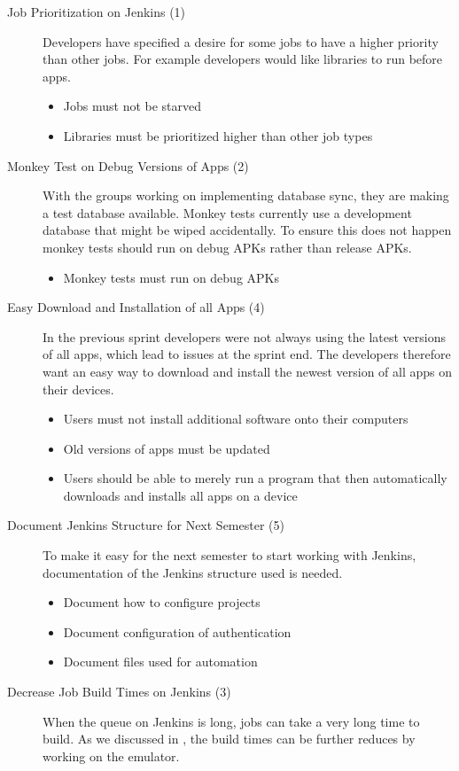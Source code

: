 \begin{description}
  \item[Job Prioritization on Jenkins (1)] Developers have specified a desire for some jobs to have a higher priority than other jobs. For example developers would like libraries to run before apps.
  \begin{itemize}
    \item Jobs must not be starved
    \item Libraries must be prioritized higher than other job types
  \end{itemize}
  \item[Monkey Test on Debug Versions of Apps (2)] With the \db groups working on implementing database sync, they are making a test database available. Monkey tests currently use a development database that might be wiped accidentally. To ensure this does not happen monkey tests should run on debug APKs rather than release APKs.
  \begin{itemize}
    \item Monkey tests must run on debug APKs
  \end{itemize}
  \item[Easy Download and Installation of all Apps (4)] In the previous sprint developers were not always using the latest versions of all apps, which lead to issues at the sprint end. The developers therefore want an easy way to download and install the newest version of all apps on their devices.
  \begin{itemize}
    \item Users must not install additional software onto their computers
    \item Old versions of apps must be updated
    \item Users should be able to merely run a program that then automatically downloads and installs all apps on a device
  \end{itemize}
  \item[Document Jenkins Structure for Next Semester (5)] To make it easy for the next semes\-ter to start working with Jenkins, documentation of the Jenkins structure used is needed.
  \begin{itemize}
    \item Document how to configure projects
    \item Document configuration of authentication
    \item Document files used for automation
  \end{itemize}
  \item[Decrease Job Build Times on Jenkins (3)] When the queue on Jenkins is long, jobs can take a very long time to build. As we discussed in , the build times can be further reduces by working on the emulator.
\end{description}

